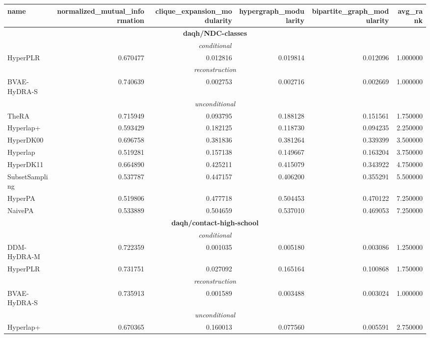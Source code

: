 \begingroup
\footnotesize
\tiny
\begin{tabular}{lrrrrr}
\toprule
name & normalized\_mutual\_information & clique\_expansion\_modularity & hypergraph\_modularity & bipartite\_graph\_modularity & avg\_rank \\
\midrule
\midrule
\multicolumn{6}{c}{\textbf{daqh/NDC-classes}} \\
\midrule
\midrule
\multicolumn{6}{c}{\emph{conditional}} \\
\midrule
HyperPLR & 0.670477 & 0.012816 & 0.019814 & 0.012096 & 1.000000 \\
\midrule
\multicolumn{6}{c}{\emph{reconstruction}} \\
\midrule
BVAE-HyDRA-S & 0.740639 & 0.002753 & 0.002716 & 0.002669 & 1.000000 \\
\midrule
\multicolumn{6}{c}{\emph{unconditional}} \\
\midrule
TheRA & 0.715949 & 0.093795 & 0.188128 & 0.151561 & 1.750000 \\
Hyperlap+ & 0.593429 & 0.182125 & 0.118730 & 0.094235 & 2.250000 \\
HyperDK00 & 0.696758 & 0.381836 & 0.381264 & 0.339399 & 3.500000 \\
Hyperlap & 0.519281 & 0.157138 & 0.149667 & 0.163204 & 3.750000 \\
HyperDK11 & 0.664890 & 0.425211 & 0.415079 & 0.343922 & 4.750000 \\
SubsetSampling & 0.537787 & 0.447157 & 0.406200 & 0.355291 & 5.500000 \\
HyperPA & 0.519806 & 0.477718 & 0.504453 & 0.470122 & 7.250000 \\
NaivePA & 0.533889 & 0.504659 & 0.537010 & 0.469053 & 7.250000 \\
\midrule
\midrule
\multicolumn{6}{c}{\textbf{daqh/contact-high-school}} \\
\midrule
\midrule
\multicolumn{6}{c}{\emph{conditional}} \\
\midrule
DDM-HyDRA-M & 0.722359 & 0.001035 & 0.005180 & 0.003086 & 1.250000 \\
HyperPLR & 0.731751 & 0.027092 & 0.165164 & 0.100868 & 1.750000 \\
\midrule
\multicolumn{6}{c}{\emph{reconstruction}} \\
\midrule
BVAE-HyDRA-S & 0.735913 & 0.001589 & 0.003488 & 0.003024 & 1.000000 \\
\midrule
\multicolumn{6}{c}{\emph{unconditional}} \\
\midrule
Hyperlap+ & 0.670365 & 0.160013 & 0.077560 & 0.005591 & 2.750000 \\

\end{tabular}
